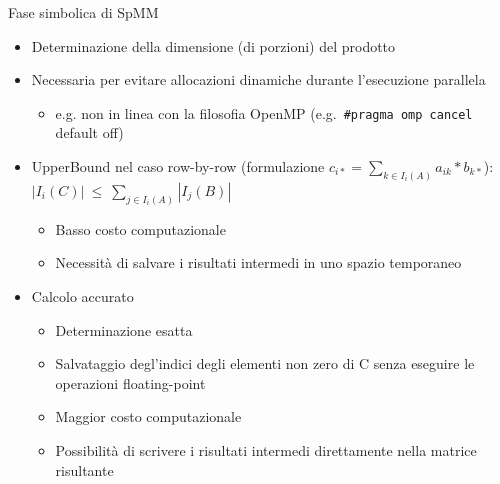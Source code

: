 \begin{frame}[fragile] {Fase simbolica di SpMM}
\begin{itemize}
	\item	Determinazione della dimensione (di porzioni) del prodotto
	\item	Necessaria per evitare allocazioni dinamiche durante l'esecuzione parallela
	\begin{itemize}
		\item	e.g. non in linea con la filosofia OpenMP (e.g. \verb|#pragma omp cancel| default off)
	\end{itemize}
	\voidLine
	\voidLine
	\item	UpperBound nel caso row-by-row (formulazione $c_{i*} = \sum\limits_{k \in I_i(A)}  a_{ik} \ast  b_{k*}$):\\
	$| I_i(C) |~\leq~\sum\limits_{ j \in I_i(A) }  | I_j(B)  |$
	\begin{itemize}
		\item	Basso costo computazionale
		\item	Necessità di salvare i risultati intermedi in uno spazio temporaneo
	\end{itemize}
	\item	Calcolo accurato
	\begin{itemize}
		\item	Determinazione esatta 
		\item	Salvataggio degl'indici degli elementi non zero di C
				senza eseguire le operazioni floating-point
		\item	Maggior costo computazionale
		\item	Possibilità di scrivere i risultati intermedi direttamente nella matrice risultante
	\end{itemize}
\end{itemize}
\end{frame}

